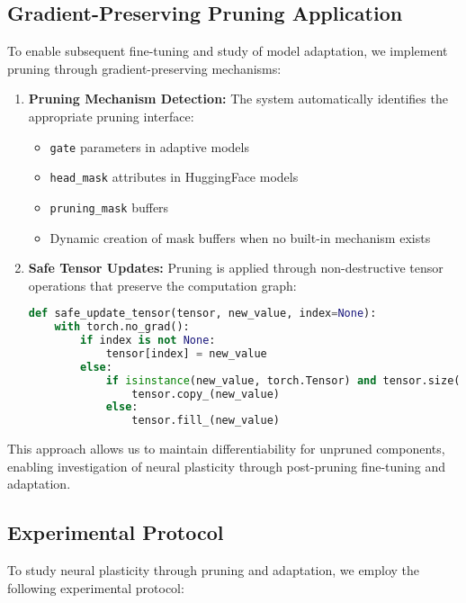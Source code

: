 \subsection{Gradient-Preserving Pruning Application}

To enable subsequent fine-tuning and study of model adaptation, we implement pruning through gradient-preserving mechanisms:

\begin{enumerate}
    \item \textbf{Pruning Mechanism Detection:} The system automatically identifies the appropriate pruning interface:
    \begin{itemize}
        \item \texttt{gate} parameters in adaptive models
        \item \texttt{head\_mask} attributes in HuggingFace models
        \item \texttt{pruning\_mask} buffers
        \item Dynamic creation of mask buffers when no built-in mechanism exists
    \end{itemize}
    
    \item \textbf{Safe Tensor Updates:} Pruning is applied through non-destructive tensor operations that preserve the computation graph:
    \begin{lstlisting}[language=Python, caption=Safe tensor update function]
def safe_update_tensor(tensor, new_value, index=None):
    with torch.no_grad():
        if index is not None:
            tensor[index] = new_value
        else:
            if isinstance(new_value, torch.Tensor) and tensor.size() == new_value.size():
                tensor.copy_(new_value)
            else:
                tensor.fill_(new_value)
    \end{lstlisting}
\end{enumerate}

This approach allows us to maintain differentiability for unpruned components, enabling investigation of neural plasticity through post-pruning fine-tuning and adaptation.

\subsection{Experimental Protocol}

To study neural plasticity through pruning and adaptation, we employ the following experimental protocol:

